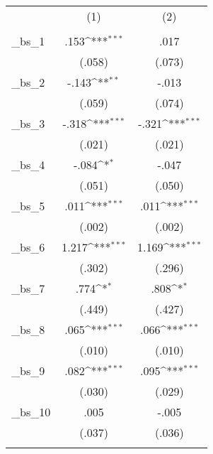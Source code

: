 {
\def\sym#1{\ifmmode^{#1}\else\(^{#1}\)\fi}
\begin{tabular}{l*{2}{c}}
\toprule
                &\multicolumn{1}{c}{(1)}&\multicolumn{1}{c}{(2)}\\
                &\multicolumn{1}{c}{}  &\multicolumn{1}{c}{}  \\
\midrule
\_bs\_1           &         .153\sym{***}&         .017         \\
                &       (.058)         &       (.073)         \\
\addlinespace
\_bs\_2           &        -.143\sym{**} &        -.013         \\
                &       (.059)         &       (.074)         \\
\addlinespace
\_bs\_3           &        -.318\sym{***}&        -.321\sym{***}\\
                &       (.021)         &       (.021)         \\
\addlinespace
\_bs\_4           &        -.084\sym{*}  &        -.047         \\
                &       (.051)         &       (.050)         \\
\addlinespace
\_bs\_5           &         .011\sym{***}&         .011\sym{***}\\
                &       (.002)         &       (.002)         \\
\addlinespace
\_bs\_6           &        1.217\sym{***}&        1.169\sym{***}\\
                &       (.302)         &       (.296)         \\
\addlinespace
\_bs\_7           &         .774\sym{*}  &         .808\sym{*}  \\
                &       (.449)         &       (.427)         \\
\addlinespace
\_bs\_8           &         .065\sym{***}&         .066\sym{***}\\
                &       (.010)         &       (.010)         \\
\addlinespace
\_bs\_9           &         .082\sym{***}&         .095\sym{***}\\
                &       (.030)         &       (.029)         \\
\addlinespace
\_bs\_10          &         .005         &        -.005         \\
                &       (.037)         &       (.036)         \\
\addlinespace

\end{tabular}}
